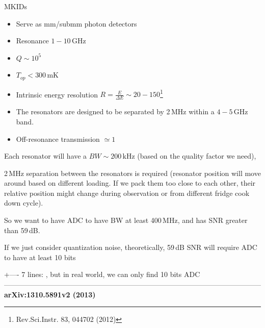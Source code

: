 \documentclass[ignorenonframetext,12pt]{beamer}
\begin{document}
\begin{frame}{MKIDs}
				\scriptsize{\begin{itemize}
								\item Serve as mm/submm photon detectors
								\item Resonance  $1-10\,\text{GHz}$
								\item $Q \sim 10^5$
								\item $T_{op} < 300\,\text{mK}$
								\item Intrinsic energy resolution $R = \frac{E}{\Delta E} \sim
												20-150$\footnote{Rev.Sci.Instr. 83, 044702 (2012)}
								\item The resonators are designed to be separated by 2\,MHz
												within a $4-5\,\text{GHz}$ band.
								\item Off-resonance transmission $\simeq 1$
				\end{itemize}
				Each resonator will have a $BW \sim 200\,\text{kHz}$ (\alert{based on the
				quality factor we need}), 

				2\,MHz separation between the resonators is required (resonator position
				will move around based on different loading. If we pack them too close
				to each other, their relative position might change during observation
				or from different fridge cook down cycle).

				So we want to have ADC to have BW at least 400\,MHz, and has SNR greater
				than 59\,dB. 

				If we just consider quantization noise, theoretically, 59\,dB SNR will
				require ADC to have at least 10 bits
				}
				+----  7 lines: , but in real world, we can only find 10 bits ADC------------------------------------------------------------------------------------------------------------
				\tiny{\textbf{arXiv:1310.5891v2 (2013)}}
\end{frame}
\end{document}

